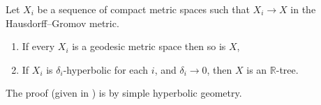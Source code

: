 \begin{theorem}\label{limittrees}
    Let $X_i$ be a sequence of compact metric spaces such that $X_i\rightarrow X$ in the Hausdorff--Gromov %
     metric.
    \begin{enumerate}
        \item If every $X_i$ is a geodesic metric space then so is $X$,
        \item If $X_i$ is $\delta_i$-hyperbolic for each $i$, and $\delta_i\rightarrow 0$, then $X$ is an $\mathbb{R}$-tree. 
    \end{enumerate}
\end{theorem}

The proof (given in \cite{BridsonSwarup}) is by simple hyperbolic geometry.



    

